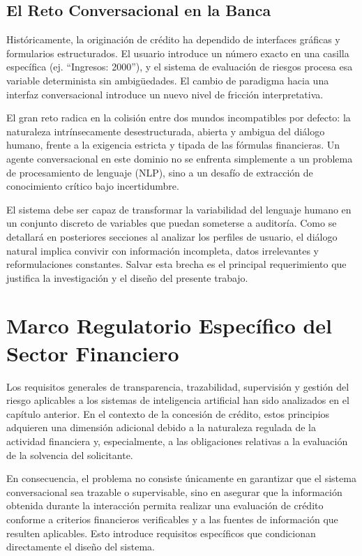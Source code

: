 \documentclass[12pt,a4paper]{report}
\begin{document}
\subsection{El Reto Conversacional en la Banca}

Históricamente, la originación de crédito ha dependido de interfaces gráficas y formularios estructurados. El usuario introduce un número exacto en una casilla específica (ej. ``Ingresos: 2000''), y el sistema de evaluación de riesgos procesa esa variable determinista sin ambigüedades. El cambio de paradigma hacia una interfaz conversacional introduce un nuevo nivel de fricción interpretativa.

El gran reto radica en la colisión entre dos mundos incompatibles por defecto: la naturaleza intrínsecamente desestructurada, abierta y ambigua del diálogo humano, frente a la exigencia estricta y tipada de las fórmulas financieras. Un agente conversacional en este dominio no se enfrenta simplemente a un problema de procesamiento de lenguaje (NLP), sino a un desafío de extracción de conocimiento crítico bajo incertidumbre.

El sistema debe ser capaz de transformar la variabilidad del lenguaje humano en un conjunto discreto de variables que puedan someterse a auditoría. Como se detallará en posteriores secciones al analizar los perfiles de usuario, el diálogo natural implica convivir con información incompleta, datos irrelevantes y reformulaciones constantes. Salvar esta brecha es el principal requerimiento que justifica la investigación y el diseño del presente trabajo.

\section{Marco Regulatorio Específico del Sector Financiero}

Los requisitos generales de transparencia, trazabilidad, supervisión y gestión del riesgo aplicables a los sistemas de inteligencia artificial han sido analizados en el capítulo anterior. En el contexto de la concesión de crédito, estos principios adquieren una dimensión adicional debido a la naturaleza regulada de la actividad financiera y, especialmente, a las obligaciones relativas a la evaluación de la solvencia del solicitante.

En consecuencia, el problema no consiste únicamente en garantizar que el sistema conversacional sea trazable o supervisable, sino en asegurar que la información obtenida durante la interacción permita realizar una evaluación de crédito conforme a criterios financieros verificables y a las fuentes de información que resulten aplicables. Esto introduce requisitos específicos que condicionan directamente el diseño del sistema.
\end{document}
